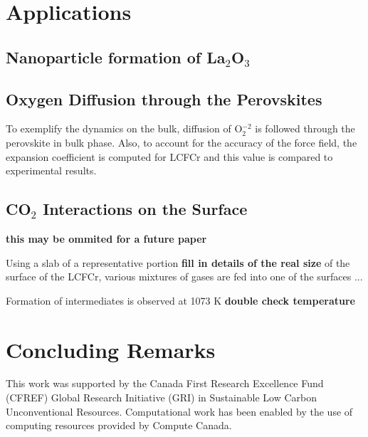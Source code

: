 \documentclass[journal=jpcafh,manuscript=article]{achemso}
\begin{document}
\section{Applications}
\label{sec:applications}

\subsection{Nanoparticle formation of La$_2$O$_3$}



\subsection{Oxygen Diffusion through the Perovskites}

To exemplify the dynamics on the bulk, diffusion of O$_2^{-2}$ is followed through the perovskite in bulk phase.
Also, to account for the accuracy of the force field, the expansion coefficient is computed for LCFCr and this value is compared to experimental results.

\subsection{CO$_2$ Interactions on the Surface}

\textbf{this may be ommited for a future paper}

Using a slab of a representative portion \textbf{fill in details of the real size} of the surface of the LCFCr, various mixtures of gases are fed into one of the surfaces ...

Formation of intermediates is observed at 1073 K \textbf{double check temperature}

\section{Concluding Remarks}
\label{sec:conclusions}


\begin{acknowledgement}
This work was supported by the Canada First Research Excellence Fund (CFREF) Global Research Initiative (GRI) in Sustainable Low Carbon Unconventional Resources.
Computational work has been enabled by the use of computing resources provided by Compute Canada.
\end{acknowledgement}

\pagebreak
\end{document}
